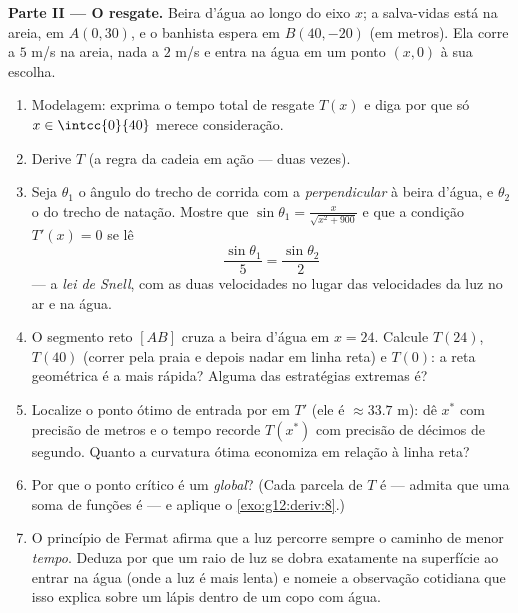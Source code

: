 \begin{problem}
\medskip
\noindent\textbf{Parte II --- O resgate.}
Beira d'água ao longo do eixo $x$; a salva-vidas está na areia, em
$A(0, 30)$, e o banhista espera em $B(40, -20)$ (em metros). Ela
corre a $5$ m/s na areia, nada a $2$ m/s e entra na água em um
ponto $(x, 0)$ à sua escolha.
\begin{enumerate}[resume]
  \item Modelagem: exprima o tempo total de resgate $T(x)$ e diga
        por que só $x \in \intcc{0}{40}$ merece consideração.
  \item Derive $T$ (a regra da cadeia em ação --- duas vezes).
  \item Seja $\theta_1$ o ângulo do trecho de corrida com a
        \emph{perpendicular} à beira d'água, e $\theta_2$ o do
        trecho de natação. Mostre que
        $\sin\theta_1 = \frac{x}{\sqrt{x^2 + 900}}$ e que a
        condição $T'(x) = 0$ se lê
        \[
        \frac{\sin\theta_1}{5} = \frac{\sin\theta_2}{2}
        \]
        --- a \emph{lei de Snell}, com as duas velocidades no
        lugar das velocidades da luz no ar e na água.
  \item O segmento reto $[AB]$ cruza a beira d'água em $x = 24$.
        Calcule $T(24)$, $T(40)$ (correr pela praia e depois
        nadar em linha reta) e $T(0)$: a reta geométrica é a mais
        rápida? Alguma das estratégias extremas é?
  \item Localize o ponto ótimo de entrada por  em $T'$
        (ele é $\approx 33.7$ m): dê $x^*$ com precisão de metros
        e o tempo recorde $T(x^*)$ com precisão de décimos de
        segundo. Quanto a curvatura ótima economiza em relação à
        linha reta?
  \item Por que o ponto crítico é um  \emph{global}? (Cada
        parcela de $T$ é  --- admita que uma soma de
        funções  é  --- e aplique o
        \cref{exo:g12:deriv:8}.)
  \item O princípio de Fermat afirma que a luz percorre sempre o
        caminho de menor \emph{tempo}. Deduza por que um raio de
        luz se dobra exatamente na superfície ao entrar na água
        (onde a luz é mais lenta) e nomeie a observação cotidiana
        que isso explica sobre um lápis dentro de um copo com
        água.
\end{enumerate}


\end{problem}

